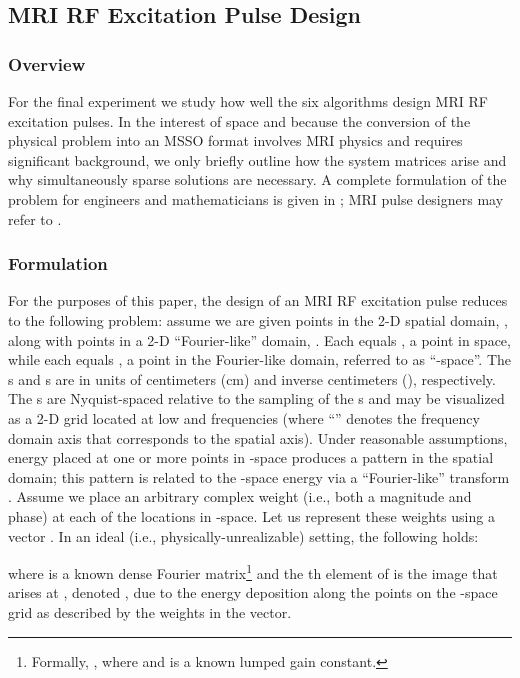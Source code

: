 \documentclass[final]{siamltex}
\begin{document}
\subsection{MRI RF Excitation Pulse Design}
\label{subsec:e3}

   \subsubsection{Overview} For the final experiment we study how well
   the six algorithms design MRI RF excitation pulses.  In the
   interest of space and because the conversion of the physical
   problem into an MSSO format involves MRI physics and requires
   significant background, we only briefly outline how the system
   matrices arise and why simultaneously sparse solutions are
   necessary.  A complete formulation of the problem for engineers and
   mathematicians is given in \cite{Zel2008_CISS}; MRI pulse designers
   may refer to \cite{Zel2008_TMI}.

   \subsubsection{Formulation} For the purposes of this paper, the
   design of an MRI RF excitation pulse reduces to the following
   problem: assume we are given  points in the 2-D spatial domain,
   , along with  points in a 2-D
   ``Fourier-like'' domain, .  Each
    equals , a point in space, while
   each  equals , a point in
   the Fourier-like domain, referred to as ``-space''.  The
   s and s are in units of centimeters (cm) and
   inverse centimeters (), respectively.  The
   s are Nyquist-spaced relative to the sampling of the
   s and may be visualized as a 2-D grid located at low
    and  frequencies (where ``'' denotes the frequency
   domain axis that corresponds to the spatial  axis).  Under
   reasonable assumptions, energy placed at one or more points in
   -space produces a pattern in the spatial domain; this pattern is
   related to the -space energy via a ``Fourier-like'' transform
   \cite{Pau1989}.  Assume we place an arbitrary complex weight  (i.e., both a magnitude and phase) at each of the
    locations in -space.  Let us represent these weights using a
   vector .
   In an ideal (i.e., physically-unrealizable) setting, the following
   holds:
   
   where  is a known dense Fourier
   matrix\footnote{Formally, ,
   where  and  is a known lumped gain
   constant.} and the th element of  is
   the image that arises at , denoted , due to
   the energy deposition along the  points on the -space grid as
   described by the weights in the  vector.
   
\end{document}
